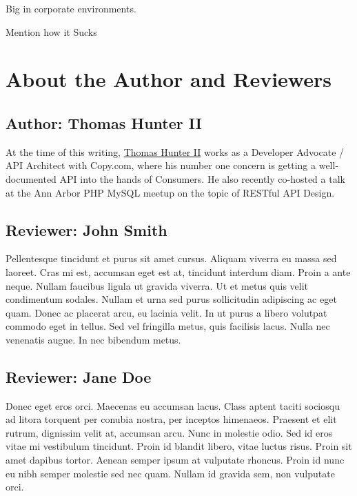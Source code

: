 \documentclass{book}
\begin{document}
Big in corporate environments.

Mention how it Sucks


\chapter{About the Author and Reviewers}

\section{Author: Thomas Hunter II}

At the time of this writing, \href{http://thomashunter.name}{Thomas Hunter II} works as a Developer Advocate / API Architect with Copy.com, where his number one concern is getting a well-documented API into the hands of Consumers. He also recently co-hosted a talk at the Ann Arbor PHP MySQL meetup on the topic of RESTful API Design.

\section{Reviewer: John Smith}

Pellentesque tincidunt et purus sit amet cursus. Aliquam viverra eu massa sed laoreet. Cras mi est, accumsan eget est at, tincidunt interdum diam. Proin a ante neque. Nullam faucibus ligula ut gravida viverra. Ut et metus quis velit condimentum sodales. Nullam et urna sed purus sollicitudin adipiscing ac eget quam. Donec ac placerat arcu, eu lacinia velit. In ut purus a libero volutpat commodo eget in tellus. Sed vel fringilla metus, quis facilisis lacus. Nulla nec venenatis augue. In nec bibendum metus.

\section{Reviewer: Jane Doe}

Donec eget eros orci. Maecenas eu accumsan lacus. Class aptent taciti sociosqu ad litora torquent per conubia nostra, per inceptos himenaeos. Praesent et elit rutrum, dignissim velit at, accumsan arcu. Nunc in molestie odio. Sed id eros vitae mi vestibulum tincidunt. Proin id blandit libero, vitae luctus risus. Proin sit amet dapibus tortor. Aenean semper ipsum at vulputate rhoncus. Proin id nunc eu nibh semper molestie sed nec quam. Nullam id gravida sem, non vulputate orci.
\end{document}
